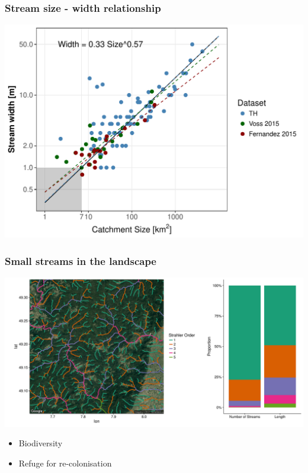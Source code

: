 \documentclass[
	12pt
	]{beamer}
\begin{document}
\begin{frame}
\frametitle{Stream size - width relationship}
	  \includegraphics[width=\textwidth]{figs/width_size.pdf}
\end{frame}


{
\begin{frame}
\frametitle{Small streams in the landscape}
	\hspace*{-10mm}\includegraphics[width=1.1\textwidth]{figs/streams_distr.pdf}
	\vspace*{-10mm}
	\begingroup
	\footnotesize
	\begin{itemize}
		\item Biodiversity
		\item Refuge for re-colonisation
	\end{itemize}
	\endgroup
\end{frame}
}
\end{document}
